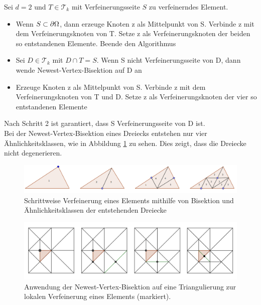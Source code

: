 \begin{algorithmus}
	Sei $d=2$ und $T\in \mathscr{T}_k$ mit Verfeinerungsseite $S$ zu verfeinerndes Element.
	\begin{itemize}
		\item[(1)] Wenn $S \subset \partial \Omega$, dann erzeuge Knoten z als Mittelpunkt von S. Verbinde z mit dem Verfeinerungsknoten von T. Setze z als Verfeinerungsknoten der beiden so entstandenen Elemente. Beende den Algorithmus
		\item[(2)] Sei $D \in \mathscr{T}_k$ mit $D\cap T = S$. Wenn S nicht Verfeinerungsseite von D, dann wende Newest-Vertex-Bisektion auf D an
		\item[(3)] Erzeuge Knoten z als Mittelpunkt von S. Verbinde z mit dem Verfeinerungsknoten von T und D. Setze z als Verfeinerungsknoten der vier so entstandenen Elemente
	\end{itemize}
\end{algorithmus}
Nach Schritt 2 ist garantiert, dass S Verfeinerungsseite von D ist. \\
Bei der Newest-Vertex-Bisektion eines Dreiecks entstehen nur vier Ähnlichkeitsklassen, wie in Abbildung \ref{schbisek} zu sehen. Dies zeigt, dass die Dreiecke nicht degenerieren.
\begin{figure}[!htbp]
	\begin{center}
		\includegraphics[width=16cm]{pics/bisec1.png}
	\end{center}
	\caption{\label{schbisek}Schrittweise Verfeinerung eines Elements mithilfe von Bisektion und Ähnlichkeitsklassen der entstehenden Dreiecke}
\end{figure}

\begin{figure}[!htbp]
	\begin{center}
		\includegraphics[width=16cm]{pics/bisec2.png}
	\end{center}
	\caption{\label{bisec}Anwendung der Newest-Vertex-Bisektion auf eine Triangulierung zur lokalen Verfeinerung eines Elements (markiert).}
\end{figure}

